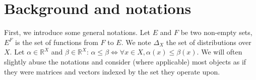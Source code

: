 \documentclass[smallextended]{svjour3}
\begin{document}
\section{Background and notations}
\label{sec:background}
First, we introduce some general notations.
Let $E$ and $F$ be two non-empty sets, $E^F$ is the set of functions from $F$ to $E$.
We note $\Delta_X$ the set of distributions over $X$.
Let $\alpha\in\mathbb{R}^X$ and $\beta\in\mathbb{R}^X$: $\alpha\leq\beta \Leftrightarrow \forall x\in X, \alpha(x) \leq \beta(x)$. We will often slightly abuse the notations and consider (where applicable) most objects as if they were matrices and vectors indexed by the set they operate upon.
\end{document}
